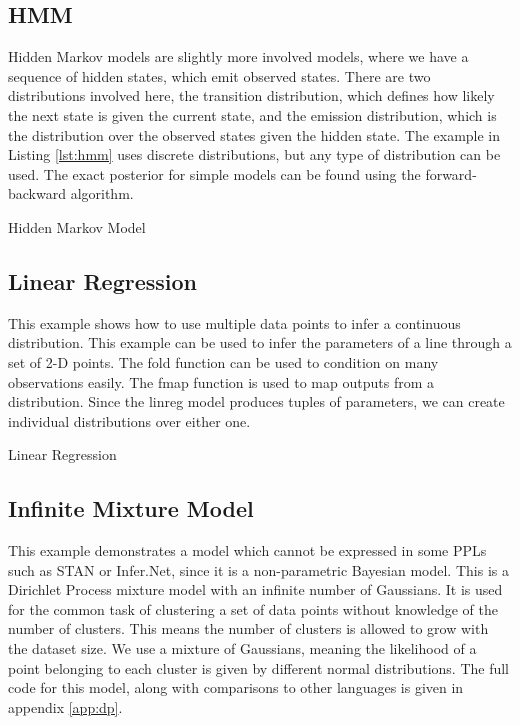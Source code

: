 \subsection{HMM}
Hidden Markov models are slightly more involved models, where we have a sequence of hidden states, which emit observed states. There are two distributions involved here, the transition distribution, which defines how likely the next state is given the current state, and the emission distribution, which is the distribution over the observed states given the hidden state. The example in Listing \ref{lst:hmm} uses discrete distributions, but any type of distribution can be used. The exact posterior for simple models can be found using the forward-backward algorithm.
\begin{listing}[!ht]
	\caption{Hidden Markov Model}
	\label{lst:hmm}
\end{listing}

\subsection{Linear Regression}
This example shows how to use multiple data points to infer a continuous distribution. This example can be used to infer the parameters of a line through a set of 2-D points. The fold function can be used to condition on many observations easily. The fmap function is used to map outputs from a distribution. Since the linreg model produces tuples of parameters, we can create individual distributions over either one.

\begin{listing}[!ht]
	\caption{Linear Regression}
	\label{lst:linreg}
\end{listing}

\subsection{Infinite Mixture Model}
This example demonstrates a model which cannot be expressed in some PPLs such as STAN or Infer.Net, since it is a non-parametric Bayesian model. This is a Dirichlet Process mixture model with an infinite number of Gaussians\cite{dpmm}. It is used for the common task of clustering a set of data points without knowledge of the number of clusters. This means the number of clusters is allowed to grow with the dataset size. We use a mixture of Gaussians, meaning the likelihood of a point belonging to each cluster is given by different normal distributions. The full code for this model, along with comparisons to other languages is given in appendix \ref{app:dp}.


